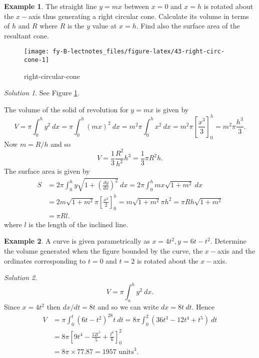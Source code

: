 \documentclass[
  11pt,
  oneside]{book}
\newcommand{\slide}{}
\theoremstyle{definition}
\theoremstyle{definition}
\newtheorem{example}{Example}[chapter]
\theoremstyle{definition}
\theoremstyle{definition}
\theoremstyle{remark}
\newtheorem*{solution}{Solution}
\begin{document}
\begin{example}
\leavevmode

The straight line \(y=mx\) between \(x=0\) and \(x=h\) is rotated about the \(x-\)axis thus generating a right circular cone. Calculate its volume in terms of \(h\) and \(R\) where \(R\) is the \(y\) value at \(x=h\). Find also the surface area of the resultant cone.

\begin{figure}

{\centering \texttt{[image: fy-B-lectnotes\_files/figure-latex/43-right-circ-cone-1]} 

}

\caption{right-circular-cone}\label{fig:43-right-circ-cone}
\end{figure}

\end{example}

\begin{solution}
See Figure \ref{fig:43-right-circ-cone}.

The volume of the solid of revolution for \(y = mx\) is given by
\[
V = \pi\int_0^hy^2\ dx = \pi\int_0^h (mx)^2\ dx = m^2\pi\int_0^hx^2\ dx = m^2\pi\left[\frac{x^3}3\right]_0^h = m^2\pi\frac{h^3}3.
\]
Now \(m = R/h\) and so
\[
V = \frac13\frac{R^2}{h^2}h^3 = \frac13\pi R^2h.
\]
The surface area is given by
\begin{align*}
S&= 2\pi\int_0^hy\sqrt{1+\left(\frac{dy}{dx}\right)^2}\ dx = 2\pi\int_0^h mx\sqrt{1+m^2}\ dx\\
&= 2m\sqrt{1+m^2}\pi\left[\frac{x^2}2\right]_0^h = m\sqrt{1+m^2}\pi h^2 = \pi R h\sqrt{1+m^2}\\
&= \pi Rl.
\end{align*}
where \(l\) is the length of the inclined line.
\end{solution}

\slide

\begin{example}
A curve is given parametrically as \(x=4t^2, y = 6t-t^2\). Determine the volume generated when the figure bounded by the curve, the \(x-\)axis and the ordinates corresponding to \(t=0\) and \(t=2\) is rotated about the \(x-\)axis.
\end{example}

\begin{solution}
\[
V = \pi\int_a^b y^2\ dx.
\]
Since \(x=4t^2\) then \(dx/dt = 8t\) and so we can write \(dx = 8t\ dt\). Hence
\begin{align*}
V& = \pi\int_0^t(6t-t^2)^28t\ dt = 8\pi\int_0^2(36t^3-12t^4+t^5)\ dt\\
& = 8\pi\left[9t^4-\frac{12t^5}5+\frac{t^6}6\right]_0^2\\
&= 8\pi\times77.87 = 1957 \text{ units}^3.
\end{align*}
\end{solution}
\end{document}
